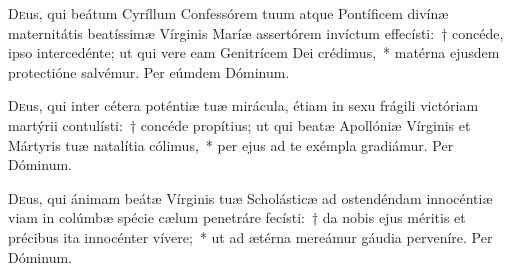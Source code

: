 \documentclass[vesperale_romanum.tex]{subfiles}
\begin{document}


\myrule



\duplexmtv


\oratio

 \lettrine{D}{e}us, qui beátum Cyríllum Confessórem tuum atque Pontíficem divínæ maternitátis beatíssimæ Vírginis Maríæ assertórem inví\-ctum effecísti:~† concéde, i\-pso intercedénte; ut qui vere eam Genitrícem Dei crédimus,~* matérna ejusdem prote\-ctióne salvémur.
Per eúmdem Dóminum.



\oratio

\lettrine{D}{e}us, qui inter cétera poténtiæ tuæ mirácula, étiam in sexu frágili vi\-ctóriam martýrii contulísti:~† concéde propítius; ut qui beatæ Apollóniæ Vírginis et Mártyris tuæ natalítia cólimus,~* per ejus ad te exémpla gradiámur. Per Dóminum.

\capitdeseqquad

\myrule

\newpage



\duplex

\oratio

\lettrine{D}{e}us, qui  ánimam beátæ Vírginis tuæ Scholásticæ ad ostendéndam innocéntiæ viam in colúmbæ spécie cælum penetráre fecísti:~† da nobis ejus méritis et précibus ita innocénter vívere;~* ut ad ætérna mereámur gáudia perveníre.
Per Dóminum.
\end{document}
